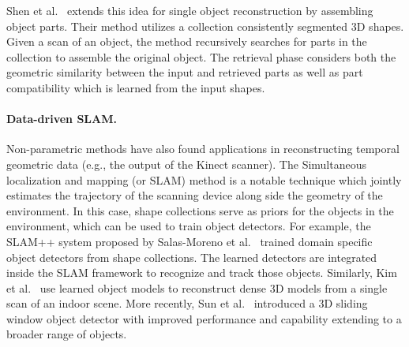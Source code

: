 Shen et al.~\cite{Shen:2012:SRP} extends this idea for single object reconstruction by assembling object parts. Their method utilizes a collection consistently segmented 3D shapes. Given a scan of an object, the method recursively searches for parts in the collection to assemble the original object. The retrieval phase considers both the geometric similarity between the input and retrieved parts as well as part compatibility which is learned from the input shapes.




\paragraph*{Data-driven SLAM.} Non-parametric methods have also found applications in reconstructing temporal geometric data (e.g., the output of the Kinect scanner). The Simultaneous localization and mapping (or SLAM) method is a notable technique which jointly estimates the trajectory of the scanning device along side the geometry of the environment. In this case, shape collections serve as priors for the objects in the environment, which can be used to train object detectors. For example, the SLAM++ system proposed by Salas-Moreno et al.~\cite{Salas-Moreno:2013:SLAM} trained domain specific object detectors from shape collections. The learned detectors are integrated inside the SLAM framework to recognize and track those objects. Similarly, Kim et al.~\cite{Kim:2012:AIE} use learned object models to reconstruct dense 3D models from a single scan of an indoor scene. More recently, Sun et al.~\cite{Sun:2014:SS} introduced a 3D sliding window object detector with improved performance and capability extending to a broader range of objects.

